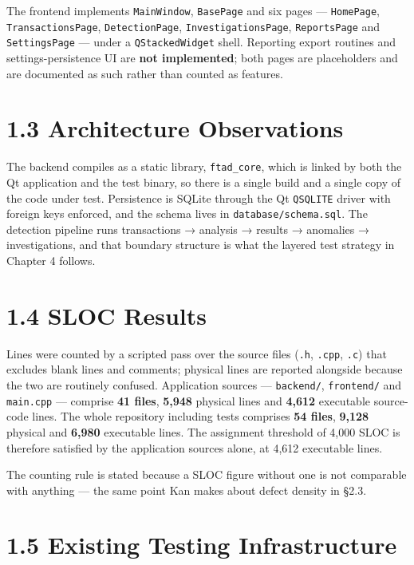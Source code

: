 \documentclass[
  12pt,
]{report}
\begin{document}
The frontend implements \texttt{MainWindow}, \texttt{BasePage} and six
pages --- \texttt{HomePage}, \texttt{Transactions\-Page},
\texttt{DetectionPage}, \texttt{Investigations\-Page},
\texttt{ReportsPage} and \texttt{SettingsPage} --- under a
\texttt{QStackedWidget} shell. Reporting export routines and
settings-persistence UI are \textbf{not implemented}; both pages are
placeholders and are documented as such rather than counted as features.

\section{1.3 Architecture Observations}\label{architecture-observations}

The backend compiles as a static library, \texttt{ftad\_core}, which is
linked by both the Qt application and the test binary, so there is a
single build and a single copy of the code under test. Persistence is
SQLite through the Qt \texttt{QSQLITE} driver with foreign keys
enforced, and the schema lives in \texttt{database/\allowbreak{}schema.sql}. The
detection pipeline runs transactions → analysis → results → anomalies →
investigations, and that boundary structure is what the layered test
strategy in Chapter 4 follows.

\section{1.4 SLOC Results}\label{sloc-results}

Lines were counted by a scripted pass over the source files
(\texttt{.h}, \texttt{.cpp}, \texttt{.c}) that excludes blank lines and
comments; physical lines are reported alongside because the two are
routinely confused. Application sources --- \texttt{backend/\allowbreak{}},
\texttt{frontend/\allowbreak{}} and \texttt{main.cpp} --- comprise \textbf{41 files},
\textbf{5,948} physical lines and \textbf{4,612} executable source-code
lines. The whole repository including tests comprises \textbf{54 files},
\textbf{9,128} physical and \textbf{6,980} executable lines. The
assignment threshold of 4,000 SLOC is therefore satisfied by the
application sources alone, at 4,612 executable lines.

The counting rule is stated because a SLOC figure without one is not
comparable with anything --- the same point Kan makes about defect
density in §2.3.

\section{1.5 Existing Testing
Infrastructure}\label{existing-testing-infrastructure}
\end{document}
